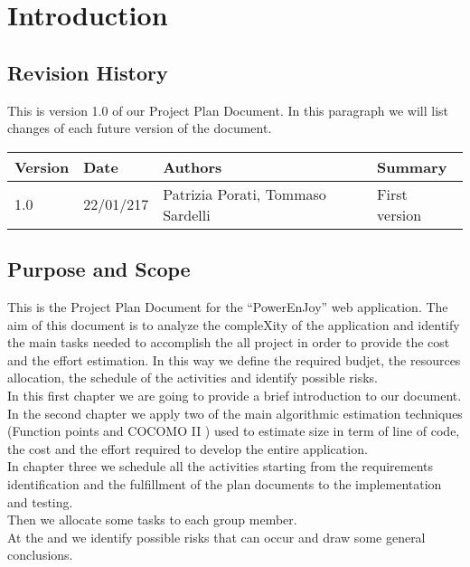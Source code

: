 \section{Introduction}

\subsection{Revision History}

	This is version 1.0 of our Project Plan Document.
	In this paragraph we will list changes of each future version of the document. \\
	
	\begin{tabular}{|l|l|l|l|}
		\hline
		\textbf{Version}	& \textbf{Date}	& \textbf{Authors}	& \textbf{Summary}\\
		\hline
		1.0					& 22/01/217		& Patrizia Porati, Tommaso Sardelli	& First version\\
		\hline
	\end{tabular}

\subsection{Purpose and Scope}

	This is the Project Plan Document for the ``PowerEnJoy'' web application. The aim of this document is to analyze the compleXity of the application and identify the main tasks needed to accomplish the all project in order to provide the cost and the effort estimation. In this way we define the required budjet, the resources allocation, the schedule of the activities and identify possible risks. \\
	In this first chapter we are going to provide a brief introduction to our document. \\
	In the second chapter we apply two of the main algorithmic estimation techniques (Function points and COCOMO  II ) used to estimate size in term of line of code, the cost and the effort required to develop the entire application. \\
	In chapter three we schedule all the activities starting from the requirements identification and the fulfillment of the plan documents to the implementation and testing. \\
	Then we allocate some tasks to each group member. \\
	At the and we identify possible risks that can occur and draw some general conclusions.
	
